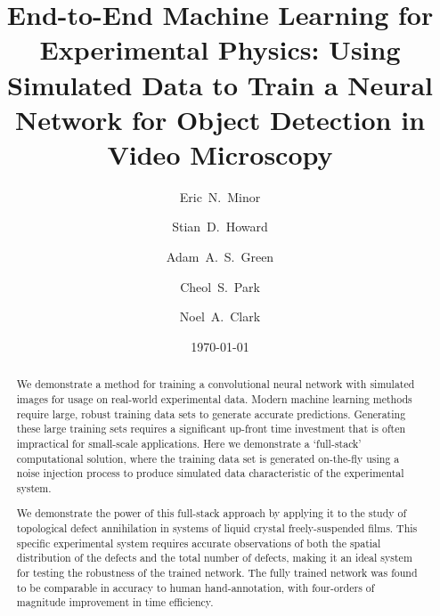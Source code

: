 \documentclass[prl,reprint,showpacs,floatfix,nofootinbib]{revtex4-1}
\begin{document}
\title{End-to-End Machine Learning for Experimental Physics: Using Simulated Data to Train a Neural Network for Object Detection in Video Microscopy}
\date{\today}
\author{Eric~N.~Minor}
\author{Stian~D.~Howard}
\author{Adam~A.~S.~Green}
\author{Cheol~S.~Park}
\author{Noel~A.~Clark}

\begin{abstract}
    
    We demonstrate a method for training a convolutional neural network with simulated images for usage on real-world experimental data. Modern machine learning methods require large, robust training data sets to generate accurate predictions. Generating these large training sets requires a significant up-front time investment that is often impractical for small-scale applications. Here we demonstrate a `full-stack' computational solution, where the training data set is generated on-the-fly using a noise injection process to produce simulated data characteristic of the experimental system.
    
    
   We demonstrate the power of this full-stack
   approach by applying it to the study of topological defect annihilation in systems of liquid crystal freely-suspended films. This specific experimental system requires accurate observations of both the spatial distribution of the defects and the total number of defects, making it an ideal system for testing the robustness of the trained network. The fully trained network was found to be comparable in accuracy to human hand-annotation, with four-orders of magnitude improvement in time efficiency.  
    
\end{abstract}
\end{document}
